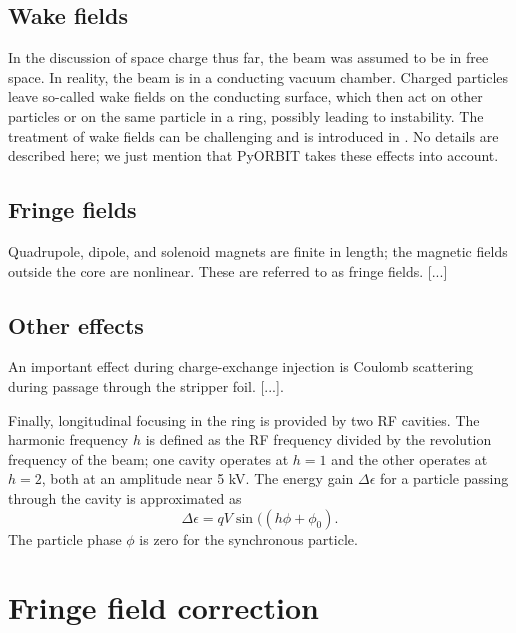 \subsection{Wake fields}

In the discussion of space charge thus far, the beam was assumed to be in free space. In reality, the beam is in a conducting vacuum chamber. Charged particles leave so-called wake fields on the conducting surface, which then act on other particles or on the same particle in a ring, possibly leading to instability. The treatment of wake fields can be challenging and is introduced in \cite{Chao1993}. No details are described here; we just mention that PyORBIT takes these effects into account.


\subsection{Fringe fields}

Quadrupole, dipole, and solenoid magnets are finite in length; the magnetic fields outside the core are nonlinear. These are referred to as fringe fields. [...]


\subsection{Other effects}

An important effect during charge-exchange injection is Coulomb scattering during passage through the stripper foil. [...].

Finally, longitudinal focusing in the ring is provided by two RF cavities. The harmonic frequency $h$ is defined as the RF frequency divided by the revolution frequency of the beam; one cavity operates at $h = 1$ and the other operates at $h = 2$, both at an amplitude near 5 kV. The energy gain $\Delta \epsilon$ for a particle passing through the cavity is approximated as  
%
\begin{equation}
    \Delta \epsilon = q V \sin((h \phi + \phi_0).
\end{equation}
%
The particle phase $\phi$ is zero for the synchronous particle.



\section{Fringe field correction}

